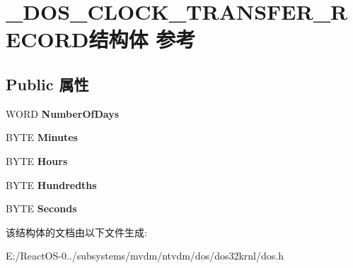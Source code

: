 \hypertarget{struct___d_o_s___c_l_o_c_k___t_r_a_n_s_f_e_r___r_e_c_o_r_d}{}\section{\+\_\+\+D\+O\+S\+\_\+\+C\+L\+O\+C\+K\+\_\+\+T\+R\+A\+N\+S\+F\+E\+R\+\_\+\+R\+E\+C\+O\+R\+D结构体 参考}
\label{struct___d_o_s___c_l_o_c_k___t_r_a_n_s_f_e_r___r_e_c_o_r_d}
\subsection*{Public 属性}
\begin{DoxyCompactItemize}
\item 
\mbox{\label{struct___d_o_s___c_l_o_c_k___t_r_a_n_s_f_e_r___r_e_c_o_r_d_a36a13582184dc0f8abb19466c99b48f3}} 
W\+O\+RD {\bfseries Number\+Of\+Days}
\item 
\mbox{\label{struct___d_o_s___c_l_o_c_k___t_r_a_n_s_f_e_r___r_e_c_o_r_d_acbe39bfc121b2d6224d4d16f8168f57a}} 
B\+Y\+TE {\bfseries Minutes}
\item 
\mbox{\label{struct___d_o_s___c_l_o_c_k___t_r_a_n_s_f_e_r___r_e_c_o_r_d_ac9a5ea5b71b3755cad6d8bd573d6b5c7}} 
B\+Y\+TE {\bfseries Hours}
\item 
\mbox{\label{struct___d_o_s___c_l_o_c_k___t_r_a_n_s_f_e_r___r_e_c_o_r_d_aa3d2aa1f5edf472efe368bfc71e14e62}} 
B\+Y\+TE {\bfseries Hundredths}
\item 
\mbox{\label{struct___d_o_s___c_l_o_c_k___t_r_a_n_s_f_e_r___r_e_c_o_r_d_a8fcd772f747c2d3c21427f3f272110c1}} 
B\+Y\+TE {\bfseries Seconds}
\end{DoxyCompactItemize}


该结构体的文档由以下文件生成\+:\begin{DoxyCompactItemize}
\item 
E\+:/\+React\+O\+S-\/0../subsystems/mvdm/ntvdm/dos/dos32krnl/dos.\+h\end{DoxyCompactItemize}
